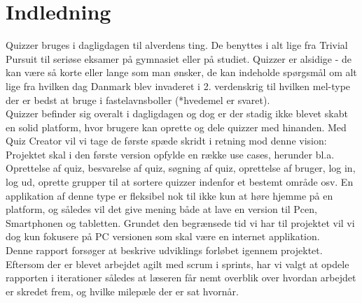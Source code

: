 \chapter{Indledning}
Quizzer bruges i dagligdagen til alverdens ting. De benyttes i alt lige fra Trivial Pursuit til seriøse eksamer på gymnasiet eller på studiet. Quizzer er alsidige - de kan være så korte eller lange som man ønsker, de kan indeholde spørgsmål om alt lige fra hvilken dag Danmark blev invaderet i 2. verdenskrig til hvilken mel-type der er bedst at bruge i fastelavnsboller (*hvedemel er svaret). \\
Quizzer befinder sig overalt i dagligdagen og dog er der stadig ikke blevet skabt en solid platform, hvor brugere kan oprette og dele quizzer med hinanden. Med Quiz Creator vil vi tage de første spæde skridt i retning mod denne vision: Projektet skal i den første version opfylde en række use cases, herunder bl.a. Oprettelse af quiz, besvarelse af quiz, søgning af quiz, oprettelse af bruger, log in, log ud, oprette grupper til at sortere quizzer indenfor et bestemt område osv. En applikation af denne type er fleksibel nok til ikke kun at høre hjemme på en platform, og således vil det give mening både at lave en version til Pcen, Smartphonen og tabletten. Grundet den begrænsede tid vi har til projektet vil vi dog kun fokusere på PC versionen som skal være en internet applikation. \\

Denne rapport forsøger at beskrive udviklings forløbet igennem projektet. Eftersom der er blevet arbejdet agilt med scrum i sprints, har vi valgt at opdele rapporten i iterationer således at læseren får nemt overblik over hvordan arbejdet er skredet frem, og hvilke milepæle der er sat hvornår.
